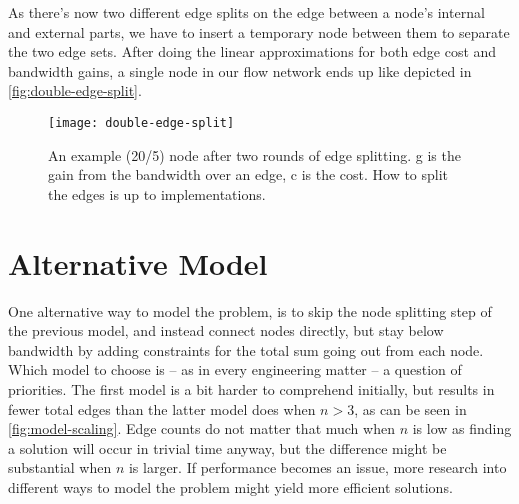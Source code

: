 As there's now two different edge splits on the edge between a node's internal and external parts, we have to insert a temporary node between them to separate the two edge sets. After doing the linear approximations for both edge cost and bandwidth gains, a single node in our flow network ends up like depicted in \autoref{fig:double-edge-split}.

\begin{figure}
    \centering
    \texttt{[image: double-edge-split]}
    \caption{An example (20/5) node after two rounds of edge splitting. g is the gain from the bandwidth over an edge, c is the cost. How to split the edges is up to implementations.}
    \label{fig:double-edge-split}
\end{figure}


\section{Alternative Model}\label{sec:alternative-model}

One alternative way to model the problem, is to skip the node splitting step of the previous model, and instead connect nodes directly, but stay below bandwidth by adding constraints for the total sum going out from each node. Which model to choose is -- as in every engineering matter -- a question of priorities. The first model is a bit harder to comprehend initially, but results in fewer total edges than the latter model does when $n>3$, as can be seen in \autoref{fig:model-scaling}. Edge counts do not matter that much when $n$ is low as finding a solution will occur in trivial time anyway, but the difference might be substantial when $n$ is larger. If performance becomes an issue, more research into different ways to model the problem might yield more efficient solutions.

